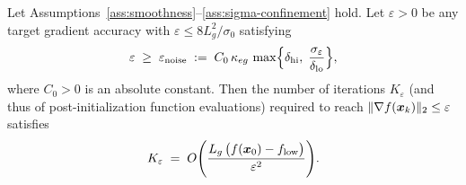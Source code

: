 \begin{theorem}
\label{thm:main-complexity}
Let Assumptions~\ref{ass:smoothness}--\ref{ass:sigma-confinement} hold. Let $\varepsilon > 0$ be any target gradient accuracy with $\varepsilon \le 8L_g^2/\sigma_0$ satisfying
\begin{equation}\label{eq:noise-floor}
  \varepsilon \;\ge\; \varepsilon_{\mathrm{noise}} \;:=\; C_0\,\kappa_{eg}\,\max\Bigl\{\delta_{\mathrm{hi}},\; \frac{\sigma_\varepsilon}{\delta_{\mathrm{lo}}}\Bigr\},
\end{equation}
where $C_0 > 0$ is an absolute constant. Then the number of iterations $K_\varepsilon$ (and thus of post-initialization function evaluations) required to reach $\|\nabla f(\boldsymbol{x}_k)\|_2 \le \varepsilon$ satisfies
\begin{equation*}
  K_\varepsilon \;=\; O\Biggl(\frac{L_g\,\bigl(f(\boldsymbol{x}_0) - f_{\mathrm{low}}\bigr)}{\varepsilon^2}\Biggr).
\end{equation*}
\end{theorem}

